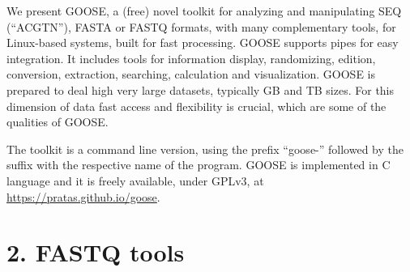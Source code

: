 \documentclass[11pt,journal,compsoc]{report}[1]
\begin{document}
We present GOOSE, a (free) novel toolkit for analyzing and manipulating
SEQ (``ACGTN''), FASTA or FASTQ formats, with many complementary tools,
for Linux-based systems, built for fast processing.
GOOSE supports pipes for easy integration. It includes tools for information 
display, randomizing, edition, conversion, extraction, searching,
calculation and visualization. GOOSE is prepared to deal high
very large datasets, typically GB and TB sizes. For this dimension of data
fast access and flexibility is crucial, which are some of the qualities of
GOOSE. 

The toolkit is a command line version, using the prefix ``goose-'' 
followed by the suffix with the respective name of the program.
GOOSE is implemented in C language and it is freely available, under GPLv3, 
at \url{https://pratas.github.io/goose}.


\chapter*{2. FASTQ tools}
\label{fastq}
\end{document}
